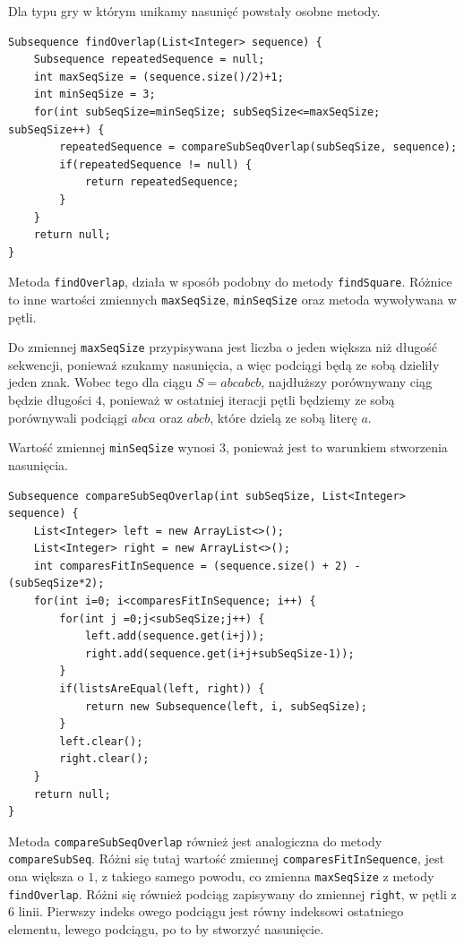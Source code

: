 \documentclass[document]{xmgr}
\begin{document}
Dla typu gry w którym unikamy nasunięć powstały osobne metody.

\begin{lstlisting}[frame=single]
Subsequence findOverlap(List<Integer> sequence) {
	Subsequence repeatedSequence = null;
	int maxSeqSize = (sequence.size()/2)+1;
	int minSeqSize = 3;
	for(int subSeqSize=minSeqSize; subSeqSize<=maxSeqSize; subSeqSize++) {
		repeatedSequence = compareSubSeqOverlap(subSeqSize, sequence);
		if(repeatedSequence != null) {
			return repeatedSequence;
		}
	}
	return null;
}
\end{lstlisting}

Metoda \texttt{findOverlap}, działa w sposób podobny do metody \texttt{findSquare}. Różnice to inne wartości zmiennych \texttt{maxSeqSize}, \texttt{minSeqSize} oraz metoda wywoływana w pętli.

Do zmiennej \texttt{maxSeqSize} przypisywana jest liczba o jeden większa niż długość sekwencji, ponieważ szukamy nasunięcia, a więc podciągi będą ze sobą dzieliły jeden znak. Wobec tego dla ciągu $S = abcabcb$, najdłuższy porównywany ciąg będzie długości $4$, ponieważ w ostatniej iteracji pętli będziemy ze sobą porównywali podciągi $abca$ oraz $abcb$, które dzielą ze sobą literę $a$.

Wartość zmiennej \texttt{minSeqSize} wynosi $3$, ponieważ jest to warunkiem stworzenia nasunięcia.

\begin{lstlisting}[frame=single]
Subsequence compareSubSeqOverlap(int subSeqSize, List<Integer> sequence) {
	List<Integer> left = new ArrayList<>();
	List<Integer> right = new ArrayList<>();
	int comparesFitInSequence = (sequence.size() + 2) - (subSeqSize*2);
	for(int i=0; i<comparesFitInSequence; i++) {
		for(int j =0;j<subSeqSize;j++) {
			left.add(sequence.get(i+j));
			right.add(sequence.get(i+j+subSeqSize-1));
		}
		if(listsAreEqual(left, right)) {
			return new Subsequence(left, i, subSeqSize);
		}
		left.clear();
		right.clear();
	}
	return null;
} 
\end{lstlisting}

Metoda \texttt{compareSubSeqOverlap} również jest analogiczna do metody \texttt{compareSubSeq}. Różni się tutaj wartość zmiennej \texttt{comparesFitInSequence}, jest ona większa o $1$, z takiego samego powodu, co zmienna \texttt{maxSeqSize} z metody \texttt{findOverlap}. Różni się również podciąg zapisywany do zmiennej \texttt{right}, w pętli z 6 linii. Pierwszy indeks owego podciągu jest równy indeksowi ostatniego elementu, lewego podciągu, po to by stworzyć nasunięcie.
\end{document}
